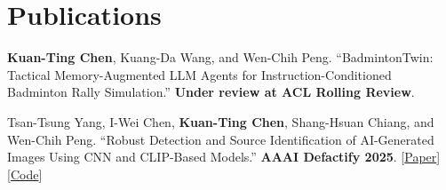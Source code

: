 \documentclass[a4paper,11pt]{article}
\newcommand{\resumeLink}[2]{\href{#1}{\textcolor{linkblue}{#2}}}
\begin{document}
\section{Publications}
{\small\color{secondary}\justifying\setlength{\parindent}{0pt}
  \textbf{\textcolor{titletext}{Kuan-Ting Chen}}, Kuang-Da Wang, and Wen-Chih Peng. ``BadmintonTwin: Tactical Memory-Augmented LLM Agents for Instruction-Conditioned Badminton Rally Simulation.'' \textbf{\textcolor{titletext}{Under review at ACL Rolling Review}}.\par\vspace{2.5pt}
  Tsan-Tsung Yang, I-Wei Chen, \textbf{\textcolor{titletext}{Kuan-Ting Chen}}, Shang-Hsuan Chiang, and Wen-Chih Peng. ``Robust Detection and Source Identification of AI-Generated Images Using CNN and CLIP-Based Models.'' \textbf{\textcolor{titletext}{AAAI Defactify 2025}}. \hspace{0.2em}[\hspace{0.1em}\resumeLink{https://arxiv.org/pdf/2503.10718}{Paper}\hspace{0.1em}] [\hspace{0.1em}\resumeLink{https://github.com/uuugaga/Defactify_4}{Code}\hspace{0.1em}]\par
}
\vspace{-2pt}
\end{document}
